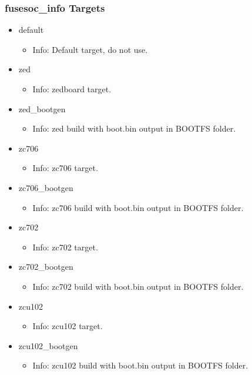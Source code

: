 \subsubsection{fusesoc\_info Targets}
\begin{itemize}
\item default
	\begin{itemize}
	\item[$\space$] Info: Default target, do not use.
	\end{itemize}
\item zed
	\begin{itemize}
	\item[$\space$] Info: zedboard target.
	\end{itemize}
\item zed\_bootgen
	\begin{itemize}
	\item[$\space$] Info: zed build with boot.bin output in BOOTFS folder.
	\end{itemize}
\item zc706
	\begin{itemize}
	\item[$\space$] Info: zc706 target.
	\end{itemize}
\item zc706\_bootgen
	\begin{itemize}
	\item[$\space$] Info: zc706 build with boot.bin output in BOOTFS folder.
	\end{itemize}
\item zc702
	\begin{itemize}
	\item[$\space$] Info: zc702 target.
	\end{itemize}
\item zc702\_bootgen
	\begin{itemize}
	\item[$\space$] Info: zc702 build with boot.bin output in BOOTFS folder.
	\end{itemize}
\item zcu102
	\begin{itemize}
	\item[$\space$] Info: zcu102 target.
	\end{itemize}
\item zcu102\_bootgen
	\begin{itemize}
	\item[$\space$] Info: zcu102 build with boot.bin output in BOOTFS folder.
	\end{itemize}

\end{itemize}
